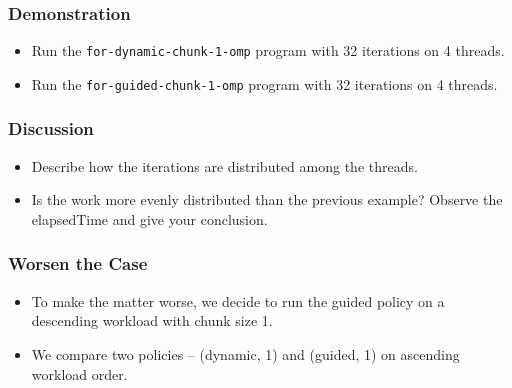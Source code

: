\documentclass{beamer}
\begin{document}
\begin{frame}
\end{frame}

\begin{frame}
\end{frame}

\begin{frame}
  \frametitle{Demonstration}
  \begin{itemize}
  \item Run the {\tt for-dynamic-chunk-1-omp} program with 32
    iterations on 4 threads.
  \item Run the {\tt for-guided-chunk-1-omp} program with 32
    iterations on 4 threads.
  \end{itemize}
\end{frame}

\begin{frame}
  \frametitle{Discussion}
  \begin{itemize}
  \item Describe how the iterations are distributed among the threads.
  \item Is the work more evenly distributed than the previous example?
    Observe the elapsedTime and give your conclusion.
  \end{itemize}
\end{frame}


\begin{frame}
  \frametitle{Worsen the Case}
  \begin{itemize}
  \item To make the matter worse, we decide to run the guided policy on
    a descending workload with chunk size 1.
  \item We compare two policies -- (dynamic, 1) and (guided, 1) on
    ascending workload order.
  \end{itemize}
\end{frame}

\begin{frame}
\end{frame}

\begin{frame}
\end{frame}
\end{document}
